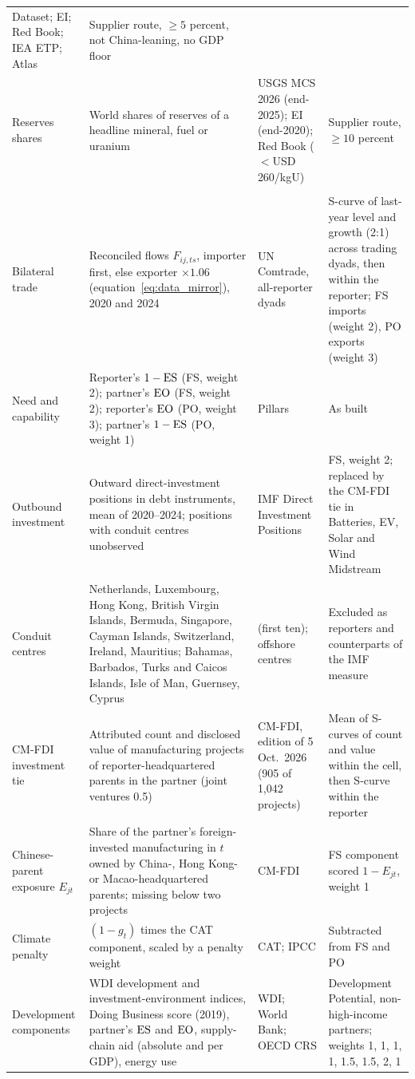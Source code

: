 {\begin{longtable}{@{}>{\raggedright\arraybackslash}p{2.7cm}
  >{\raggedright\arraybackslash}p{5.1cm}
  >{\raggedright\arraybackslash}p{3.1cm}
  >{\raggedright\arraybackslash}p{4.6cm}@{}}
  Dataset; EI; Red Book; IEA ETP; Atlas & Supplier route, $\ge5$ percent, not China-leaning, no
  GDP floor\\
Reserves shares & World shares of reserves of a headline mineral, fuel or uranium & USGS MCS 2026
  (end-2025); EI (end-2020); Red Book ($<$USD 260/kgU) & Supplier route, $\ge10$ percent\\
\addlinespace
\multicolumn{4}{@{}l}{\textit{Partnership indices (Section~\ref{sec:bilateral})}}\\
Bilateral trade & Reconciled flows $F_{ij,ts}$, importer first, else exporter $\times1.06$
  (equation~\eqref{eq:data_mirror}), 2020 and 2024 & UN Comtrade, all-reporter dyads & S-curve
  of last-year level and growth (2:1) across trading dyads, then within the reporter; FS imports
  (weight 2), PO exports (weight 3)\\
Need and capability & Reporter's $1-\mathrm{ES}$ (FS, weight 2); partner's $\mathrm{EO}$ (FS, weight 2);
  reporter's $\mathrm{EO}$ (PO, weight 3); partner's $1-\mathrm{ES}$ (PO, weight 1) & Pillars & As built\\
Outbound investment & Outward direct-investment positions in debt instruments, mean of
  2020--2024; positions with conduit centres unobserved & IMF Direct Investment Positions & FS,
  weight 2; replaced by the CM-FDI tie in Batteries, EV, Solar and Wind Midstream\\
Conduit centres & Netherlands, Luxembourg, Hong Kong, British Virgin Islands, Bermuda,
  Singapore, Cayman Islands, Switzerland, Ireland, Mauritius; Bahamas, Barbados, Turks and
  Caicos Islands, Isle of Man, Guernsey, Cyprus & \citet{damgaard2024real} (first ten); offshore
  centres & Excluded as reporters and counterparts of the IMF measure\\
CM-FDI investment tie & Attributed count and disclosed value of manufacturing projects of
  reporter-headquartered parents in the partner (joint ventures 0.5) & CM-FDI, edition of
  5 Oct.\ 2026 (905 of 1,042 projects) & Mean of S-curves of count and value within the cell,
  then S-curve within the reporter\\
Chinese-parent exposure $E_{jt}$ & Share of the partner's foreign-invested manufacturing in $t$
  owned by China-, Hong Kong- or Macao-headquartered parents; missing below two projects &
  CM-FDI & FS component scored $1-E_{jt}$, weight 1\\
Climate penalty & $(1-g_t)$ times the CAT component, scaled by a penalty weight & CAT; IPCC &
  Subtracted from FS and PO\\
Development components & WDI development and investment-environment indices, Doing Business
  score (2019), partner's $\mathrm{ES}$ and $\mathrm{EO}$, supply-chain aid (absolute and per GDP), energy use &
  WDI; World Bank; OECD CRS & Development Potential, non-high-income partners; weights 1, 1, 1,
  1, 1.5, 1.5, 2, 1\\
\end{longtable}
}

